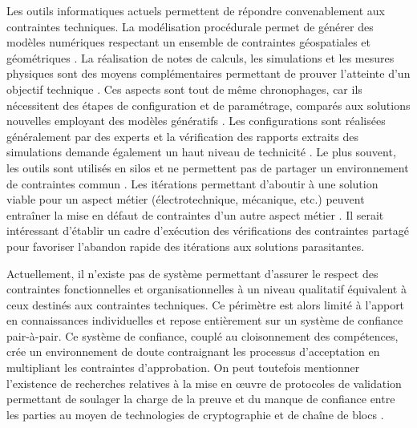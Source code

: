 \documentclass[a4paper,12pt]{article}
\begin{document}
Les outils informatiques actuels permettent de répondre convenablement aux contraintes techniques. La modélisation procédurale permet de générer des modèles numériques respectant un ensemble de contraintes géospatiales et géométriques \autocite{s.dineshkumarBIMbasedAutomatedSite2015}. La réalisation de notes de calculs, les simulations et les mesures physiques sont des moyens complémentaires permettant de prouver l’atteinte d’un objectif technique \autocite{tomc.borstBIMSimulation2015,galSimulationEnergetiqueDynamique2025a}. Ces aspects sont tout de même chronophages, car ils nécessitent des étapes de configuration et de paramétrage, comparés aux solutions nouvelles employant des modèles génératifs \autocite{chaillouLintelligenceArtificielleAu2021a}. Les configurations sont réalisées généralement par des experts et la vérification des rapports extraits des simulations demande également un haut niveau de technicité \autocite{delsavioVirtualDesignConstruction2022a}. Le plus souvent, les outils sont utilisés en silos et ne permettent pas de partager un environnement de contraintes commun \autocite{moreauConceptionElectriqueQuelles2019a}. Les itérations permettant d’aboutir à une solution viable pour un aspect métier (électrotechnique, mécanique, etc.) peuvent entraîner la mise en défaut de contraintes d’un autre aspect métier \autocite{vandebrugInterdisciplinaryConfigurationMethods2025a}. Il serait intéressant d’établir un cadre d'exécution des vérifications des contraintes partagé pour favoriser l’abandon rapide des itérations aux solutions parasitantes.

Actuellement, il n'existe pas de système permettant d’assurer le respect des contraintes fonctionnelles et organisationnelles à un niveau qualitatif équivalent à ceux destinés aux contraintes techniques. Ce périmètre est alors limité à l'apport en connaissances individuelles et repose entièrement sur un système de confiance pair-à-pair. Ce système de confiance, couplé au cloisonnement des compétences, crée un environnement de doute contraignant les processus d'acceptation en multipliant les contraintes d’approbation. On peut toutefois mentionner l’existence de recherches relatives à la mise en œuvre de protocoles de validation permettant de soulager la charge de la preuve et du manque de confiance entre les parties au moyen de technologies de cryptographie et de chaîne de blocs \autocite{mathewsBIM+BlockchainSolutionTrust2017a}. 
\end{document}
